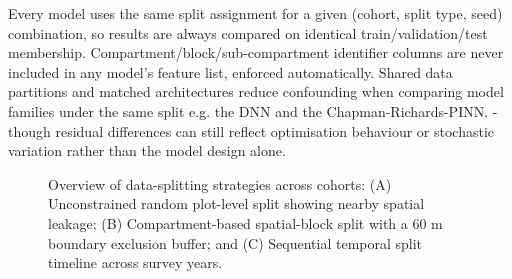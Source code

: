 Every model uses the same split assignment for a given (cohort, split type, seed) combination, so results are always compared on identical train/validation/test membership. Compartment/block/sub-compartment identifier columns are never included in any model's feature list, enforced automatically. Shared data partitions and matched architectures reduce confounding when comparing model families under the same split e.g. the DNN and the Chapman-Richards-PINN. - though residual differences can still reflect optimisation behaviour or stochastic variation rather than the model design alone. %


\begin{figure}[!htbp]
\centering
\begin{minipage}[b]{0.32\textwidth}
  \centering
\end{minipage}\hfill
\begin{minipage}[b]{0.32\textwidth}
  \centering
\end{minipage}\hfill
\begin{minipage}[b]{0.32\textwidth}
  \centering
\end{minipage}
\caption{Overview of data-splitting strategies across cohorts: (A) Unconstrained random plot-level split showing nearby spatial leakage; (B) Compartment-based spatial-block split with a $60\text{~m}$ boundary exclusion buffer; and (C) Sequential temporal split timeline across survey years.}
\label{fig:splits-combined}
\end{figure}

